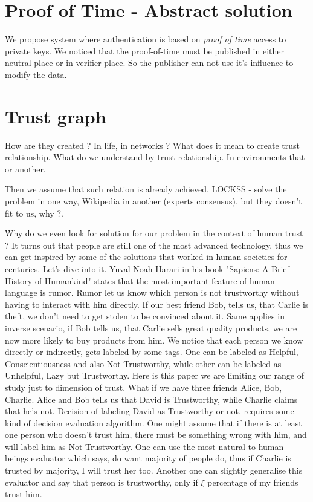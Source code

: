 \documentclass[nostrict]{szablonPG}
\begin{document}
\section{Proof of Time - Abstract solution}
We propose system where authentication is based on \textit{proof of time} access to private keys. 
We noticed that the proof-of-time must be published in either neutral place or in verifier place. So the publisher can not use it's influence to modify the data. 

\section{Trust graph}
How are they created ? In life, in networks ? What does it mean to create trust relationship. What do we understand by trust relationship. In environments that or another. 

Then we assume that such relation is already achieved. 
LOCKSS - solve the problem in one way, Wikipedia in another (experts consensus), but they doesn't fit to us, why ?. 

Why do we even look for solution for our problem in the context of human trust ? It turns out that people are still one of the most advanced technology, thus we can get inspired by some of the solutions that worked in human societies for centuries. Let's dive into it.
Yuval Noah Harari in his book "Sapiens: A Brief History of Humankind" states that the most important feature of human language is rumor. Rumor let us know which person is not trustworthy without having to interact with him directly. If our best friend Bob, tells us, that Carlie is theft, we don't need to get stolen to be convinced about it. Same applies in inverse scenario, if Bob tells us, that Carlie sells great quality products, we are now more likely to buy products from him. We notice that each person we know directly or indirectly, gets labeled by some tags. One can be labeled as Helpful, Conscientiousness and also Not-Trustworthy, while other can be labeled as Unhelpful, Lazy but Trustworthy. Here is this paper we are limiting our range of study just to dimension of trust.
What if we have three friends Alice, Bob, Charlie. Alice and  Bob tells us that David is Trustworthy, while Charlie claims that he's not. Decision of labeling David as Trustworthy or not, requires some kind of decision evaluation algorithm.
One might assume that if there is at least one person who doesn't trust him, there must be something wrong with him, and will label him as Not-Trustworthy. One can use the most natural to human beings evaluator which says, do want majority of people do, thus if Charlie is trusted by majority, I will trust her too. Another one can slightly generalise this evaluator and say that person is trustworthy, only if $\xi$ percentage of my friends trust him. 
\end{document}
